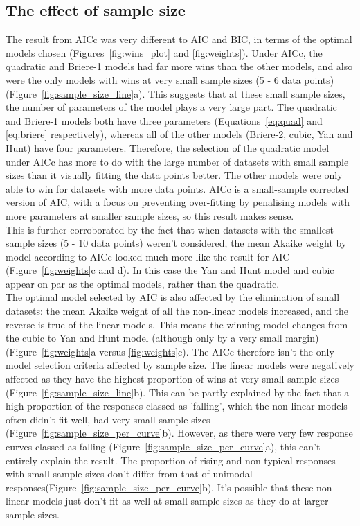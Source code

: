 \documentclass[11pt]{article}
\begin{document}
\subsection{The effect of sample size}
The result from AICc was very different to AIC and BIC, in terms of the optimal models chosen (Figures~\ref{fig:wins_plot} and \ref{fig:weights}). Under AICc, the quadratic and Briere-1 models had far more wins than the other models, and also were the only models with wins at very small sample sizes (5 - 6 data points) (Figure~\ref{fig:sample_size_line}a). This suggests that at these small sample sizes, the number of parameters of the model plays a very large part. The quadratic and Briere-1 models both have three parameters (Equations~\ref{eq:quad} and \ref{eq:briere} respectively), whereas all of the other models (Briere-2, cubic, Yan and Hunt) have four parameters. Therefore, the selection of the quadratic model under AICc has more to do with the large number of datasets with small sample sizes than it visually fitting the data points better. The other models were only able to win for datasets with more data points. AICc is a small-sample corrected version of AIC, with a focus on preventing over-fitting by penalising models with more parameters at smaller sample sizes, so this result makes sense.
\\

This is further corroborated by the fact that when datasets with the smallest sample sizes (5 - 10 data points) weren't considered, the mean Akaike weight by model according to AICc looked much more like the result for AIC (Figure~\ref{fig:weights}c and d). In this case the Yan and Hunt model and cubic appear on par as the optimal models, rather than the quadratic. 
\\

The optimal model selected by AIC is also affected by the elimination of small datasets: the mean Akaike weight of all the non-linear models increased, and the reverse is true of the linear models. This means the winning model changes from the cubic to Yan and Hunt model (although only by a very small margin) (Figure~\ref{fig:weights}a versus \ref{fig:weights}c). The AICc therefore isn't the only model selection criteria affected by sample size. The linear models were negatively affected as they have the highest proportion of wins at very small sample sizes (Figure~\ref{fig:sample_size_line}b). This can be partly explained by the fact that a high proportion of the responses classed as 'falling', which the non-linear models often didn't fit well, had very small sample sizes (Figure~\ref{fig:sample_size_per_curve}b). However, as there were very few response curves classed as falling (Figure~\ref{fig:sample_size_per_curve}a), this can't entirely explain the result. The proportion of rising and non-typical responses with small sample sizes don't differ from that of unimodal responses(Figure~\ref{fig:sample_size_per_curve}b). It's possible that these non-linear models just don't fit as well at small sample sizes as they do at larger sample sizes.
\end{document}
